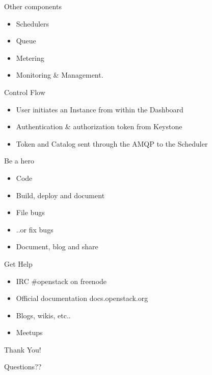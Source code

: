 \documentclass{beamer}
\begin{document}
\begin{frame}{Other components}
\begin{itemize}
 \item Schedulers
 \item Queue
 \item Metering
 \item Monitoring \& Management.
\end{itemize}
\end{frame}

\begin{frame}{Control Flow}
\begin{itemize}
 \item User initiates an Instance from within the Dashboard
 \item Authentication \& authorization token from Keystone
 \item Token and Catalog sent through the AMQP to the Scheduler
\end{itemize}
\end{frame}

\begin{frame}{Be a hero}
\begin{itemize}
 \item Code
 \item Build, deploy and document
 \item File bugs
 \item ..or fix bugs
 \item Document, blog and share
\end{itemize}
\end{frame}

\begin{frame}{Get Help}
\begin{itemize}
 \item IRC \#openstack on freenode
 \item Official documentation docs.openstack.org
 \item Blogs, wikis, etc..
 \item Meetups
\end{itemize}
\end{frame}

\begin{frame}{Thank You!}
\begin{center}
Questions??
\end{center}
\end{frame}
\end{document}
